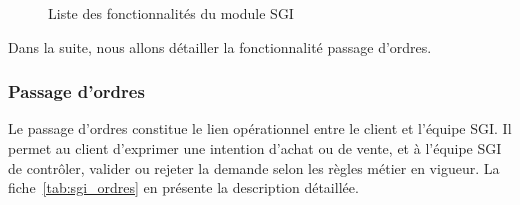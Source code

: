 \begin{figure}[H]
    \centering
    \caption{Liste des fonctionnalités du module SGI}
    \label{fig:fonctionnalites_sgi}
\end{figure}

Dans la suite, nous allons détailler la fonctionnalité passage d'ordres.

\subsubsection{Passage d'ordres}

Le passage d'ordres constitue le lien opérationnel entre le client et l'équipe SGI. Il
permet au client d'exprimer une intention d'achat ou de vente, et à l'équipe SGI de
contrôler, valider ou rejeter la demande selon les règles métier en vigueur. La
fiche~\ref{tab:sgi_ordres} en présente la description détaillée.


